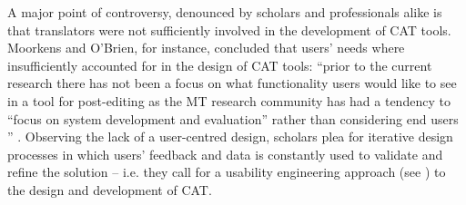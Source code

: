 A major point of controversy, denounced by scholars and professionals alike is that translators were not sufficiently involved in the development of CAT tools. Moorkens and O’Brien, for instance, concluded that users’ needs where insufficiently accounted for in the design of CAT tools: ``prior to the current research there has not been a focus on what functionality users would like to see in a tool for post-editing as the MT research community has had a tendency to ``focus on system development and evaluation'' rather than considering end users \citep[4]{doherty2019translation}'' \citep{moorkens2017assessing}. Observing the lack of a user-centred design, scholars plea for iterative design processes in which users’ feedback and data is constantly used to validate and refine the solution \citep{laubli2019translation} -- i.e. they call for a usability engineering approach (see ) to the design and development of CAT.

